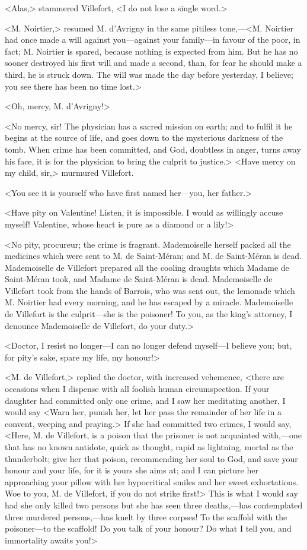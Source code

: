  <Alas,> stammered Villefort, <I do not lose a single word.> 

 <M. Noirtier,> resumed M. d'Avrigny in the same pitiless tone,—<M. Noirtier had once made a will against you—against your family—in favour of the poor, in fact; M. Noirtier is spared, because nothing is expected from him. But he has no sooner destroyed his first will and made a second, than, for fear he should make a third, he is struck down. The will was made the day before yesterday, I believe; you see there has been no time lost.> 

 <Oh, mercy, M. d'Avrigny!> 

 <No mercy, sir! The physician has a sacred mission on earth; and to fulfil it he begins at the source of life, and goes down to the mysterious darkness of the tomb. When crime has been committed, and God, doubtless in anger, turns away his face, it is for the physician to bring the culprit to justice.>  <Have mercy on my child, sir,> murmured Villefort. 

 <You see it is yourself who have first named her—you, her father.> 

 <Have pity on Valentine! Listen, it is impossible. I would as willingly accuse myself! Valentine, whose heart is pure as a diamond or a lily!> 

 <No pity, procureur; the crime is fragrant. Mademoiselle herself packed all the medicines which were sent to M. de Saint-Méran; and M. de Saint-Méran is dead. Mademoiselle de Villefort prepared all the cooling draughts which Madame de Saint-Méran took, and Madame de Saint-Méran is dead. Mademoiselle de Villefort took from the hands of Barrois, who was sent out, the lemonade which M. Noirtier had every morning, and he has escaped by a miracle. Mademoiselle de Villefort is the culprit—she is the poisoner! To you, as the king's attorney, I denounce Mademoiselle de Villefort, do your duty.> 

 <Doctor, I resist no longer—I can no longer defend myself—I believe you; but, for pity's sake, spare my life, my honour!> 

 <M. de Villefort,> replied the doctor, with increased vehemence, <there are occasions when I dispense with all foolish human circumspection. If your daughter had committed only one crime, and I saw her meditating another, I would say <Warn her, punish her, let her pass the remainder of her life in a convent, weeping and praying.> If she had committed two crimes, I would say, <Here, M. de Villefort, is a poison that the prisoner is not acquainted with,—one that has no known antidote, quick as thought, rapid as lightning, mortal as the thunderbolt; give her that poison, recommending her soul to God, and save your honour and your life, for it is yours she aims at; and I can picture her approaching your pillow with her hypocritical smiles and her sweet exhortations. Woe to you, M. de Villefort, if you do not strike first!> This is what I would say had she only killed two persons but she has seen three deaths,—has contemplated three murdered persons,—has knelt by three corpses! To the scaffold with the poisoner—to the scaffold! Do you talk of your honour? Do what I tell you, and immortality awaits you!> 


